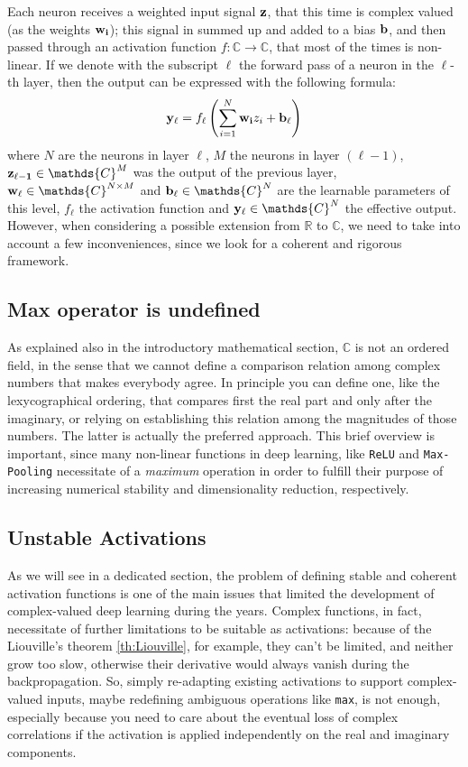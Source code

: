 \documentclass[../main.tex]{subfiles}
\begin{document}
Each neuron receives a weighted input signal $\vb{z}$, that this time is complex valued (as the weights $\vb{w_i}$); this signal in summed up and added to a bias $\vb{b}$, and then passed through an activation function $f:\mathds{C}\to\mathds{C}$, that most of the times is non-linear. If we denote with the subscript $\ell$ the forward pass of a neuron in the $\ell$-th layer, then the output can be expressed with the following formula:
\[ \vb{y}_\ell = f_\ell\left(\sum_{i=1}^{N}\vb{w_i}z_i + \vb{b}_\ell\right) \]
where $N$ are the neurons in layer $\ell$, $M$ the neurons in layer $(\ell-1)$, $\vb{z_{\ell-1}}\in\mathds{C}^M$ was the output of the previous layer, $\vb{w}_\ell\in\mathds{C}^{N\times M}$ and $\vb{b}_\ell\in\mathds{C}^N$ are the learnable parameters of this level, $f_\ell$ the activation function and $\vb{y}_\ell\in\mathds{C}^N$ the effective output.\\
However, when considering a possible extension from $\mathds{R}$ to $\mathds{C}$, we need to take into account a few inconveniences, since we look for a coherent and rigorous framework. 

\subsection*{Max operator is undefined}
As explained also in the introductory mathematical section, $\mathds{C}$ is not an ordered field, in the sense that we cannot define a comparison relation among complex numbers that makes everybody agree. In principle you can define one, like the lexycographical ordering, that compares first the real part and only after the imaginary, or relying on establishing this relation among the magnitudes of those numbers. The latter is actually the preferred approach. This brief overview is important, since many non-linear functions in deep learning, like \texttt{ReLU} and \texttt{Max-Pooling} necessitate of a \textit{maximum} operation in order to fulfill their purpose of increasing numerical stability and dimensionality reduction, respectively.

\subsection*{Unstable Activations}
As we will see in a dedicated section, the problem of defining stable and coherent activation functions is one of the main issues that limited the development of complex-valued deep learning during the years. Complex functions, in fact, necessitate of further limitations to be suitable as activations: because of the Liouville's theorem \ref{th:Liouville}, for example, they can't be limited, and neither grow too slow, otherwise their derivative would always vanish during the backpropagation. So, simply re-adapting existing activations to support complex-valued inputs, maybe redefining ambiguous operations like \texttt{max}, is not enough, especially because you need to care about the eventual loss of complex correlations if the activation is applied independently on the real and imaginary components.
\end{document}
